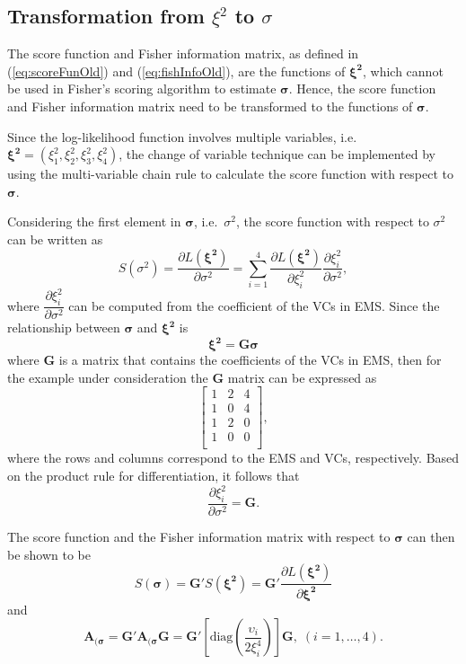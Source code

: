 \documentclass[12pt,a4paper]{article}
\newcommand{\A}{\mathbf{A}}
\newcommand{\G}{\mathbf{G}}
\begin{document}
\subsection{Transformation from {\boldmath $\xi^2$} to {\boldmath $\sigma$}}
The score function and Fisher information matrix, as defined in (\ref{eq:scoreFunOld}) and (\ref{eq:fishInfoOld}), are the functions of $\bm{\xi^2}$, which cannot be used in Fisher's scoring algorithm to estimate $\bm{\sigma}$. Hence, the score function and Fisher information matrix need to be transformed to the functions of $\bm{\sigma}$.
 
Since the log-likelihood function involves multiple variables, i.e. $\bm{\xi^2} = (\xi_1^2, \xi_2^2,\xi_3^2,\xi_4^2)$, the change of variable technique can be implemented by using the multi-variable chain rule to calculate the score function with respect to $\bm{\sigma}$.

Considering the first element in $\bm{\sigma}$, i.e.\ $\sigma^2$, the score function with respect to $\sigma^2$ can be written as 
\[S(\sigma^2) =\dfrac{\partial L(\bm{\xi^2})}{\partial \sigma^2} = \sum_{i = 1}^4 \dfrac{\partial L(\bm{\xi^2})}{\partial  \xi_i^2} \dfrac{\partial \xi_i^2}{\partial \sigma^2},  \]
where $\dfrac{\partial \xi_i^2}{\partial \sigma^2}$ can be computed from the coefficient of the VCs in EMS. Since the relationship between $\bm{\sigma}$ and $\bm{\xi^2}$ is 
\[\bm{\xi^2} = \G \bm{\sigma}\]
where $\G$ is a matrix that contains the coefficients of the VCs in EMS, then for the example under consideration the $\G$ matrix can be expressed as 
\[\begin{bmatrix}               
1 & 2 & 4\\
1 & 0 & 4\\
1 & 2 & 0\\
1 & 0 & 0\\
\end{bmatrix},\]
where the rows and columns correspond to the EMS and VCs, respectively. Based on the product rule for differentiation, it follows that 
\[\dfrac{\partial \xi_i^2}{\partial \sigma^2} = \G.\] 

The score function and the Fisher information matrix with respect to $\bm{\sigma}$ can then be shown to be 
\begin{equation}\label{eq:scoreFunNew}
S(\bm{\sigma}) = \G' S(\bm{\xi^2})= \G' \dfrac{\partial L(\bm{\xi^2})}{\partial \bm{\xi^2}}
\end{equation}
and 
\begin{equation}\label{eq:fishInfoNew}
\A_{(\bm{\sigma}} = \G' \A_{(\bm{\sigma}} \G =  \G' \left[\mathrm{diag}\left( \dfrac{\upsilon_i }{2\xi_i^4}\right)\right] \G, \; (i = 1, \dots, 4).
\end{equation}
\end{document}

